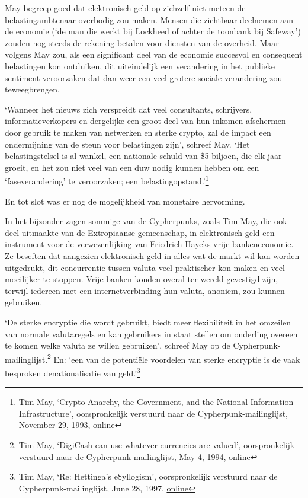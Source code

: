 \documentclass[
  a5paper,
  smalldemyvopaper,11pt,twoside,onecolumn,openright,extrafontsizes,
hidelinks]{memoir}
\begin{document}
May begreep goed dat elektronisch geld op zichzelf niet meteen de
belastingambtenaar overbodig zou maken. Mensen die zichtbaar deelnemen
aan de economie (`de man die werkt bij Lockheed of achter de toonbank
bij Safeway') zouden nog steeds de rekening betalen voor diensten van de
overheid. Maar volgens May zou, als een significant deel van de economie
succesvol en consequent belastingen kon ontduiken, dit uiteindelijk een
verandering in het publieke sentiment veroorzaken dat dan weer een veel
grotere sociale verandering zou teweegbrengen.

`Wanneer het nieuws zich verspreidt dat veel consultants, schrijvers,
informatieverkopers en dergelijke een groot deel van hun inkomen
afschermen door gebruik te maken van netwerken en sterke crypto, zal de
impact een ondermijning van de steun voor belastingen zijn', schreef
May. `Het belastingstelsel is al wankel, een nationale schuld van \$5
biljoen, die elk jaar groeit, en het zou niet veel van een duw nodig
kunnen hebben om een `faseverandering' te veroorzaken; een
belastingopstand.'\footnote{Tim May, `Crypto Anarchy, the Government,
  and the National Information Infrastructure', oorspronkelijk verstuurd
  naar de Cypherpunk-mailinglijst, November 29, 1993,
  \href{https://cypherpunks.venona.com/date/1993/11/msg01106.html}{online}}

En tot slot was er nog de mogelijkheid van monetaire hervorming.

In het bijzonder zagen sommige van de Cypherpunks, zoals Tim May, die
ook deel uitmaakte van de Extropiaanse gemeenschap, in elektronisch geld
een instrument voor de verwezenlijking van Friedrich Hayeks vrije
bankeneconomie. Ze beseften dat aangezien elektronisch geld in alles wat
de markt wil kan worden uitgedrukt, dit concurrentie tussen valuta veel
praktischer kon maken en veel moeilijker te stoppen. Vrije banken konden
overal ter wereld gevestigd zijn, terwijl iedereen met een
internetverbinding hun valuta, anoniem, zou kunnen gebruiken.

`De sterke encryptie die wordt gebruikt, biedt meer flexibiliteit in het
omzeilen van normale valutaregels en kan gebruikers in staat stellen om
onderling overeen te komen welke valuta ze willen gebruiken', schreef
May op de Cypherpunk-mailinglijst.\footnote{Tim May, `DigiCash can use
  whatever currencies are valued', oorspronkelijk verstuurd naar de
  Cypherpunk-mailinglijst, May 4, 1994,
  \href{https://cypherpunks.venona.com/date/1994/05/msg00243.html}{online}}
En: `een van de potentiële voordelen van sterke encryptie is de vaak
besproken denationalisatie van geld.'\footnote{Tim May, `Re: Hettinga's
  e\$yllogism', oorspronkelijk verstuurd naar de
  Cypherpunk-mailinglijst, June 28, 1997,
  \href{https://cypherpunks.venona.com/date/1997/06/msg01637.html}{online}}
\end{document}
